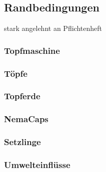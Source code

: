 \subsection{Randbedingungen}
stark angelehnt an Pflichtenheft
\subsubsection{Topfmaschine}

\subsubsection{Töpfe}

\subsubsection{Topferde}

\subsubsection{NemaCaps}

\subsubsection{Setzlinge}

\subsubsection{Umwelteinflüsse}
